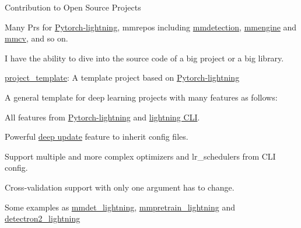 
\begin{cventries}

	\cventry
	{} %
	{Contribution to Open Source Projects} %
	{\hfill} %
	{} %
	{
		\vspace{-3.5mm}
		\begin{cvitems} %
			\item{Many Prs for \href{https://github.com/Lightning-AI/lightning}{\textcolor{link}{Pytorch-lightning}}, mmrepos including \href{https://github.com/open-mmlab/mmdetection}{\textcolor{link}{mmdetection}}, \href{https://github.com/open-mmlab/mmengine}{\textcolor{link}{mmengine}} and \href{https://github.com/open-mmlab/mmcv}{\textcolor{link}{mmcv}}, and so on.}
			\item{I have the ability to dive into the source code of a big project or a big library.}
		\end{cvitems}
	}

	\cventry
	{} %
	{\href{https://github.com/shenmishajing/project_template}{\textcolor{link}{project\_template}}: A template project based on \href{https://github.com/Lightning-AI/lightning}{\textcolor{link}{Pytorch-lightning}}} %
	{\hfill} %
	{} %
	{
		\vspace{-3.5mm}
		A general template for deep learning projects with many features as follows:
		\begin{cvitems} %
			\item{All features from \href{https://github.com/Lightning-AI/lightning}{\textcolor{link}{Pytorch-lightning}} and \href{https://pytorch-lightning.readthedocs.io/en/stable/cli/lightning_cli.html}{\textcolor{link}{lightning CLI}}.}
			\item{Powerful \href{https://github.com/shenmishajing/lightning_template/blob/main/docs/configs/deep_update.md}{\textcolor{link}{deep update}} feature to inherit config files.}
			\item{Support multiple and more complex optimizers and lr\_schedulers from CLI config.}
			\item{Cross-validation support with only one argument has to change.}
		\end{cvitems}
		Some examples as \href{https://github.com/shenmishajing/mmdet_lightning}{\textcolor{link}{mmdet\_lightning}}, \href{https://github.com/shenmishajing/mmpretrain_lightning}{\textcolor{link}{mmpretrain\_lightning}} and \href{https://github.com/shenmishajing/detectron2_lightning}{\textcolor{link}{detectron2\_lightning}}
	}

\end{cventries}
